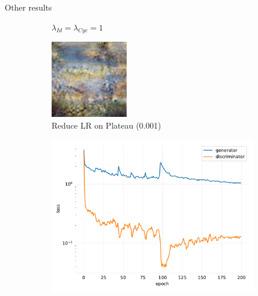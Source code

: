 \documentclass[12pt]{beamer}
\begin{document}
\begin{frame}{Other results}
\begin{figure}[H]
\begin{subfigure}[b]{0.3\textwidth}
                \caption{$\lambda_{Id} = \lambda_{Cyc} = 1$}
            \end{subfigure}
            \hfill
            \begin{subfigure}[b]{0.3\textwidth}
                \centering
                \includegraphics[width=\textwidth]{resources/cycle-gan/main3.png}
                \caption{Reduce LR on Plateau (0.001)}
            \end{subfigure}
            \begin{subfigure}[b]{0.3\textwidth}
                \centering
                \includegraphics[width=\textwidth]{resources/cycle-gan/main10.pdf}

\end{subfigure}
\end{figure}
\end{frame}
\end{document}
